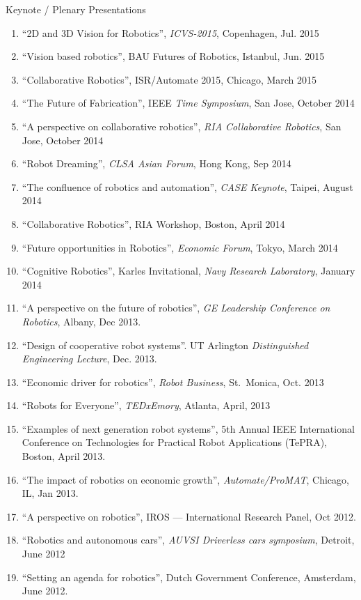 \documentclass{article}
\begin{document}
\begin{cv}
\begin{cvlist}{Keynote / Plenary Presentations}
\begin{enumerate}
			\item ``2D and 3D Vision for Robotics'', {\em ICVS-2015}, Copenhagen, Jul. 2015
			\item ``Vision based robotics'', BAU Futures of Robotics, Istanbul, Jun. 2015
			\item ``Collaborative Robotics'', ISR/Automate 2015, Chicago, March 2015
			\item ``The Future of Fabrication'', IEEE {\em Time Symposium}, San Jose, October 2014
			\item ``A perspective on collaborative robotics'', {\em RIA Collaborative Robotics}, San Jose, October 2014
			\item ``Robot Dreaming'', {\em CLSA Asian Forum}, Hong Kong, Sep 2014
			\item ``The confluence of robotics and automation'', {\em CASE Keynote}, Taipei, August 2014
			\item ``Collaborative Robotics'', RIA Workshop, Boston, April 2014
			\item ``Future opportunities in Robotics'', {\em Economic Forum}, Tokyo, March 2014
			\item ``Cognitive Robotics'', Karles Invitational, {\em Navy Research Laboratory}, January 2014
			\item ``A perspective on the future of robotics'', {\em GE Leadership Conference on Robotics}, Albany, Dec 2013.
			\item ``Design of cooperative robot systems''. UT Arlington {\em Distinguished Engineering Lecture}, Dec. 2013.
			\item ``Economic driver for robotics'', {\em Robot Business}, St.\ Monica,  Oct. 2013
			\item ``Robots for Everyone'', {\em TEDxEmory}, Atlanta, April, 2013
			\item ``Examples of next generation robot systems'', 5th Annual IEEE
			      International Conference on Technologies for Practical Robot
			      Applications (TePRA), Boston, April 2013.
			\item ``The impact of robotics on economic growth'', {\em Automate/ProMAT}, Chicago, IL, Jan 2013.
			\item ``A perspective on robotics'', IROS --- International Research  Panel, Oct 2012.
			\item ``Robotics and autonomous cars'', {\em AUVSI Driverless cars symposium}, Detroit, June 2012
			\item ``Setting an agenda for robotics'', Dutch Government  Conference, Amsterdam, June 2012.

\end{enumerate}
\end{cvlist}
\end{cv}
\end{document}
